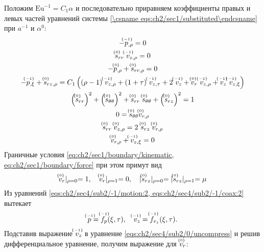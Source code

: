 Положим $\text{Eu}^{-1} = C_1 \alpha$ и последовательно приравняем коэффициенты правых и левых частей уравнений системы \cref{\csname eqs:ch2/sec1/substituted\endcsname} при $a^{-1}$ и $\alpha^0$:
\label{eqs:ch2/sec4/sub2/main}
\begin{gather}
  \label{eqs:ch2/sec4/sub2/-1/motion:2}
  -\uindex{p}{-1}_{,\rho} = 0
  \\
  \label{eqs:ch2/sec4/sub2/-1/coax:2}
  \uindex{s}{0}_{rr} \; \uindex{v}{-1}_{z,\rho} = 0
  \\
  \label{eqs:ch2/sec4/sub2/0/motion:1}
  -\uindex{p}{0}_{,\rho}+\uindex{s}{0}_{rr,\rho} = 0
  \\
  \label{eqs:ch2/sec4/sub2/0/motion:2}
  -\uindex{p}{-1}_{,\xi} + \uindex{s}{0}_{rz,\rho} = C_1 \left((\rho-1) \ \uindex{v}{-1}_{z,\rho} + (1+\tau) \ \uindex{v}{-1}_{z,\tau} + 2 \ \uindex{v}{-1}_{z} + \uindex{v}{0}_{r} \ \uindex{v}{-1}_{z,\rho} + \uindex{v}{-1}_{z} \ \uindex{v}{-1}_{z,\xi} \right)
  \\
  \label{eqs:ch2/sec4/sub2/0/plasticity}
  \left(\uindex{s}{0}_{rr}\right)^2 + \left(\uindex{s}{0}_{\theta\theta}\right)^2 + \uindex{s}{0}_{rr}\; \uindex{s}{0}_{\theta\theta} + \left(\uindex{s}{0}_{rz}\right)^2 = 1
  \\
  \label{eqs:ch2/sec4/sub2/0/coax:1}
  0 = \uindex{s}{0}_{\theta\theta} \uindex{v}{0}_{r,\rho}
  \\
  \label{eqs:ch2/sec4/sub2/0/coax:2}
  \uindex{s}{0}_{rr} \; \uindex{v}{0}_{z,\rho} = 2 \ \uindex{s}{0}_{rz} \; \uindex{v}{0}_{r,\rho}
  \\
  \label{eqs:ch2/sec4/sub2/0/uncompress}
  \uindex{v}{0}_{r,\rho} + \uindex{v}{-1}_{z,\xi} = 0
\end{gather}
Граничные условия \cref{eq:ch2/sec1/boundary/kinematic, eq:ch2/sec1/boundary/force} при этом примут вид
\begin{equation}
  \label{eq:ch2/sec4/sub2/boundary/0}
  \uindex{v}{0}_{r}\lvert_{\rho=0} = 1,\quad \uindex{v}{0}_{r}\lvert_{\rho=1} = 0, \quad \lvert \uindex{s}{0}_{rz}\lvert_{\rho=0} = \lvert \uindex{s}{0}_{rz}\lvert_{\rho=1} = \mu
\end{equation}
Из уравнений \cref{eqs:ch2/sec4/sub2/-1/motion:2, eqs:ch2/sec4/sub2/-1/coax:2} вытекает
\begin{equation*}
  \uindex{p}{-1} = \uindex{f}{-1}_{p}(\xi, \tau), \quad \uindex{v}{-1}_{z} = \uindex{f}{-1}_{v_{z}}(\xi, \tau).
\end{equation*}
Подставив выражение $\uindex{v}{-1}_{z}$ в уравнение \cref{eqs:ch2/sec4/sub2/0/uncompress} и решив дифференциальное уравнение, получим выражение для $\uindex{v}{0}_{r}$:
